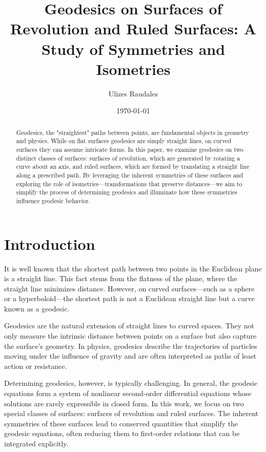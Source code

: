 \documentclass[12pt]{article}
\title{Geodesics on Surfaces of Revolution and Ruled Surfaces: A Study of Symmetries and Isometries}
\author{Ulizes Raudales}
\date{\today}
\begin{document}
\maketitle

\newpage
\tableofcontents
\newpage

\begin{abstract}
    Geodesics, the "straightest" paths between points, are fundamental objects in geometry and physics. 
    While on flat surfaces geodesics are simply straight lines, on curved surfaces they can assume intricate forms. 
    In this paper, we examine geodesics on two distinct classes of surfaces: surfaces of revolution, which are generated by rotating a curve about an axis, and ruled surfaces, which are formed by translating a straight line along a prescribed path. 
    By leveraging the inherent symmetries of these surfaces and exploring the role of isometries—transformations that preserve distances—we aim to simplify the process of determining geodesics and illuminate how these symmetries influence geodesic behavior. 
\end{abstract}

\newpage

\section{Introduction}

It is well known that the shortest path between two points in the Euclidean plane is a straight line. 
This fact stems from the flatness of the plane, where the straight line minimizes distance. 
However, on curved surfaces—such as a sphere or a hyperboloid—the shortest path is not a Euclidean straight line but a curve known as a geodesic.

Geodesics are the natural extension of straight lines to curved spaces. 
They not only measure the intrinsic distance between points on a surface but also capture the surface’s geometry. 
In physics, geodesics describe the trajectories of particles moving under the influence of gravity and are often interpreted as paths of least action or resistance.

Determining geodesics, however, is typically challenging. 
In general, the geodesic equations form a system of nonlinear second-order differential equations whose solutions are rarely expressible in closed form. 
In this work, we focus on two special classes of surfaces: surfaces of revolution and ruled surfaces. 
The inherent symmetries of these surfaces lead to conserved quantities that simplify the geodesic equations, often reducing them to first-order relations that can be integrated explicitly.
\end{document}
